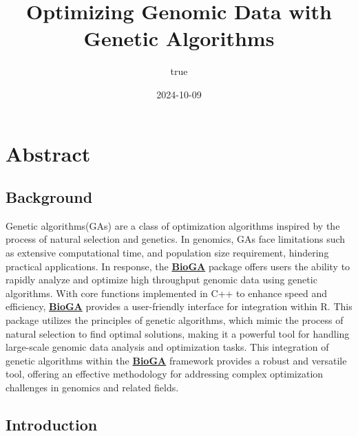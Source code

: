 \documentclass[
]{article}
\title{Optimizing Genomic Data with Genetic Algorithms}
\author{true}
\date{2024-10-09}
\begin{document}
\maketitle

{
\setcounter{tocdepth}{2}
\tableofcontents
}
\fontsize{14.5}{20}
\selectfont

\section{Abstract}\label{abstract}

\subsection{Background}\label{background}

Genetic algorithms(GAs) are a class of optimization algorithms inspired
by the process of natural selection and genetics. In genomics, GAs face
limitations such as extensive computational time, and population size
requirement, hindering practical applications. In response, the
\href{https://doi.org/doi:10.18129/B9.bioc.BioGA}{\textbf{BioGA}}
package offers users the ability to rapidly analyze and optimize high
throughput genomic data using genetic algorithms. With core functions
implemented in C++ to enhance speed and efficiency,
\href{https://doi.org/doi:10.18129/B9.bioc.BioGA}{\textbf{BioGA}}
provides a user-friendly interface for integration within R. This
package utilizes the principles of genetic algorithms, which mimic the
process of natural selection to find optimal solutions, making it a
powerful tool for handling large-scale genomic data analysis and
optimization tasks. This integration of genetic algorithms within the
\href{https://doi.org/doi:10.18129/B9.bioc.BioGA}{\textbf{BioGA}}
framework provides a robust and versatile tool, offering an effective
methodology for addressing complex optimization challenges in genomics
and related fields.

\subsection{Introduction}\label{introduction}
\end{document}
